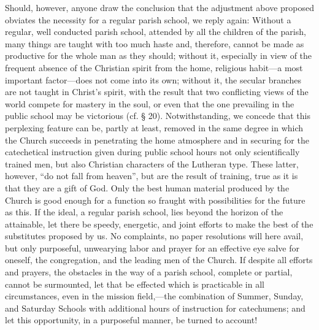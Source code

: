 Should, however, anyone draw the conclusion that the adjustment above proposed obviates the necessity for a regular parish school, we reply again: Without a regular, well conducted parish school, attended by all the children of the parish, many things are taught with too much haste and, therefore, cannot be made as productive for the whole man as they should; without it, especially in view of the frequent absence of the Christian spirit from the home, religious habit—a most important factor—does not come into its own; without it, the secular branches are not taught in Christ’s spirit, with the result that two conflicting views of the world compete for mastery in the soul, or even that the one prevailing in the public school may be victorious (cf. § 20). Notwithstanding,
we concede that this perplexing feature can be, partly at least, removed in the same degree in which the Church succeeds in penetrating the home atmosphere and in securing for the catechetical instruction given during public school hours not only scientifically trained men, but also Christian characters of the Lutheran type. These latter, however, “do not fall from heaven”, but are the result of training, true as it is that they are a gift of God. Only the best human material produced by the Church is good enough for a function so fraught with possibilities for the future as this. If the ideal, a regular parish school, lies beyond the horizon of the attainable, let there be speedy, energetic, and joint efforts to make the best of the substitutes proposed by us. No complaints, no paper resolutions will here avail, but only purposeful, unwearying labor and prayer for an effective eye salve for oneself, the congregation, and the leading men of the Church. If despite all efforts and prayers, the obstacles in the way of a parish school, complete or partial, cannot be surmounted, let that be effected which is practicable in all circumstances, even in the mission field,—the combination of Summer, Sunday, and Saturday Schools with additional hours of instruction for catechumens; and let this opportunity, in a purposeful manner, be turned to account!

\trenner

